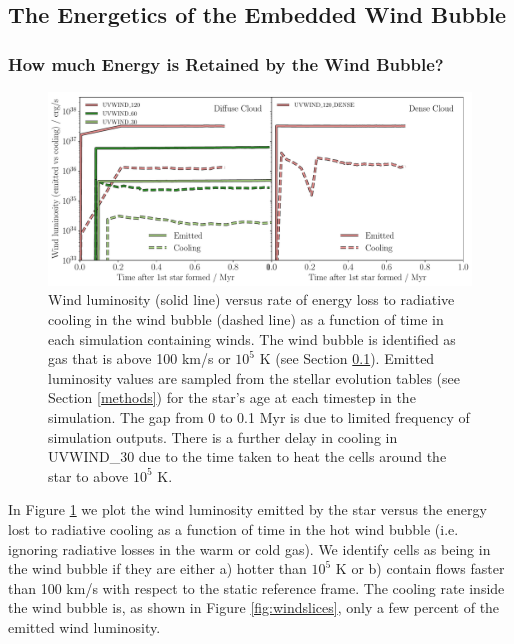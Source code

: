 \documentclass[a4paper,fleqn,usenatbib]{mnras}
\begin{document}
\subsection{The Energetics of the Embedded Wind Bubble}
\label{results:energeticswindbubble}

\subsubsection{How much Energy is Retained by the Wind Bubble?}

\begin{figure}
\includegraphics[width=1.98\columnwidth]{../plots/windLemittedvscool_both.pdf}
\caption{Wind luminosity (solid line) versus rate of energy loss to radiative cooling in the wind bubble (dashed line) as a function of time in each simulation containing winds. The wind bubble is identified as gas that is above 100 km/s or $10^5$ K (see Section \protect\ref{results:energeticswindbubble}). Emitted luminosity values are sampled from the stellar evolution tables (see Section \protect\ref{methods}) for the star's age at each timestep in the simulation. The gap from 0 to 0.1 Myr is due to limited frequency of simulation outputs. There is a further delay in cooling in UVWIND\_30 due to the time taken to heat the cells around the star to above $10^5$ K.}
\label{fig:windLemittedvscool}
\end{figure}

In Figure \ref{fig:windLemittedvscool} we plot the wind luminosity emitted by the star versus the energy lost to radiative cooling as a function of time in the hot wind bubble (i.e. ignoring radiative losses in the warm or cold gas). We identify cells as being in the wind bubble if they are either a) hotter than $10^5$ K or b) contain flows faster than 100 km/s with respect to the static reference frame. The cooling rate inside the wind bubble is, as shown in Figure \ref{fig:windslices}, only a few percent of the emitted wind luminosity. 
\end{document}
